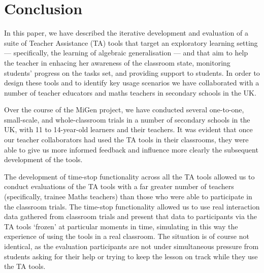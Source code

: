 \section{Conclusion}
\label{sec:conclusion}

In this paper, we have described the iterative development and evaluation of a suite
of Teacher Assistance (TA) tools that target an exploratory learning setting ---
specifically, the learning of algebraic generalisation --- and
that aim to help the teacher in enhacing her awareness of the classroom state, 
monitoring students' progress on the tasks set, and providing support to students. 
In order to design these tools and to identify key usage scenarios 
we have collaborated with a number of teacher educators and 
maths teachers in secondary schools in the UK. 

Over the course of the MiGen project, we have conducted several one-to-one, 
small-scale, and whole-classroom trials in a number of secondary
schools in the UK, with 11 to 14-year-old learners and their teachers. 
It was evident that once our teacher collaborators had used the TA tools in their
classrooms, they were able to give us more informed feedback and
influence more clearly the subsequent development of the tools. 

The development of time-stop functionality across all the TA tools 
allowed us to conduct evaluations of the TA tools with a far greater
number of teachers (specifically, trainee Maths teachers) 
than those who were able to participate in the classroom trials. 
The time-stop functionality allowed us to use real interaction data 
gathered from classroom trials and present that data to participants
via the TA tools `frozen' at particular moments in time,  
simulating in this way the experience of using the tools in a real classroom. 
The situation is of course not identical, as the evaluation participants
are not under simultaneous pressure from students asking for their help 
or trying to keep the lesson on track while they use the TA
tools. 


